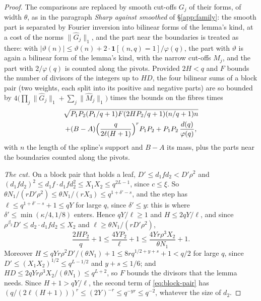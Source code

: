 \documentclass[11pt]{article}
\numberwithin{equation}{section}
\begin{document}
\begin{proof}
The comparisons are replaced by smooth cut-offs $G_j$ of their forms, of width $\theta$, as in the paragraph \emph{Sharp
against smoothed} of \S\ref{app:family}: the smooth part is separated by Fourier inversion into bilinear forms of the
lemma's kind, at a cost of the norms $\|\hat G_j\|_1$, and the part
near the boundaries is treated as there: with $|\vartheta(n)| \le \vartheta(n) + 2 \cdot \mathbf 1[(n, q) =
1]/\varphi(q)$, the part with $\vartheta$ is again a bilinear form of the lemma's kind, with the narrow cut-offs $M_j$,
and
the part with $2/\varphi(q)$ is counted along the pivots. Provided $2H < q$ and $F$ bounds the number of divisors of the
integers up to $HD$, the four bilinear sums of a block pair (two weights, each split into its positive and negative
parts) are so bounded by $4\bigl(\prod_j \|\hat G_j\|_1 + \sum_j \|\hat M_j\|_1\bigr)$
times the bounds on the fibres times
\begin{multline}\label{eq:block-pair}
  \sqrt{P_1 P_2 (P_1/q + 1) F (2HP_2/q + 1) (n/q + 1) n} \\
  + (B - A) \Bigl(\frac q{2\ell(H + 1)}\Bigr)^r P_1 P_2 + P_1 P_2 \, \frac{d(q)}{\varphi(q)},
\end{multline}
with $n$ the length of the spline's support and $B - A$ its mass, plus the parts near the boundaries counted along the
pivots.

\emph{The cut.} On a block pair that holds a leaf, $D' \le d_1 f d_2 < D'\rho^2$ and $(d_1 f d_2)^2 \le d_1 f \cdot d_1
f d_2^2 \le X_1 X_2 \le q^{2L - 1}$, since $c \le \xi$. So $\theta N_1/(rD'\rho^2) \le \theta N_1/(rX_3) \le q^{1 +
\delta' - s}$, and the step has $\ell \le q^{1 + \delta' - s} + 1 \le qY$ for large $q$, since $\delta' \le y$: this is
where $\delta' \le \min(\kappa/4, 1/8)$ enters. Hence $qY/\ell \ge 1$ and $H \le 2qY/\ell$, and since $\rho^{\beta_2} D'
\le d_2 \cdot d_1 f d_2 \le X_2$ and $\ell \ge \theta N_1/(rD'\rho^2)$,
\[
  \frac{2HP_2}q + 1 \le \frac{4YP_2}\ell + 1 \le \frac{4Yr\rho^3 X_2}{\theta N_1} + 1.
\]
Moreover $H \le qYr\rho^2 D'/(\theta N_1) + 1 \le 8rq^{1/2 + y + s} + 1 < q/2$ for large $q$, since $D' \le (X_1
X_2)^{1/2} \le q^{L - 1/2}$ and $y + s \le 1/6$; and $HD \le 2qYr\rho^3 X_2/(\theta N_1) \le q^{L + 2}$, so $F$ bounds
the divisors that the lemma needs. Since $H + 1 > qY/\ell$, the second term of \eqref{eq:block-pair} has $(q/(2\ell(H +
1)))^r \le (2Y)^{-r} \le q^{-yr} \le q^{-2}$, whatever the size of $d_2$.


\end{proof}
\end{document}
